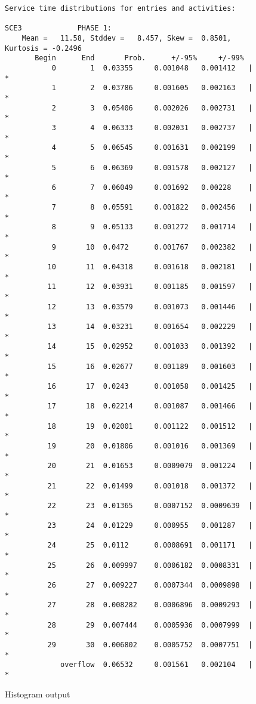 \begin{sidewaysfigure}
\begin{verbatim}
Service time distributions for entries and activities:

SCE3             PHASE 1: 
    Mean =   11.58, Stddev =   8.457, Skew =  0.8501, Kurtosis = -0.2496
       Begin      End       Prob.      +/-95%     +/-99%
           0        1  0.03355     0.001048   0.001412   |          *
           1        2  0.03786     0.001605   0.002163   |            *
           2        3  0.05406     0.002026   0.002731   |                 *
           3        4  0.06333     0.002031   0.002737   |                   *
           4        5  0.06545     0.001631   0.002199   |                    *
           5        6  0.06369     0.001578   0.002127   |                   *
           6        7  0.06049     0.001692   0.00228    |                  *
           7        8  0.05591     0.001822   0.002456   |                 *
           8        9  0.05133     0.001272   0.001714   |                *
           9       10  0.0472      0.001767   0.002382   |              *
          10       11  0.04318     0.001618   0.002181   |             *
          11       12  0.03931     0.001185   0.001597   |            *
          12       13  0.03579     0.001073   0.001446   |           *
          13       14  0.03231     0.001654   0.002229   |          *
          14       15  0.02952     0.001033   0.001392   |         *
          15       16  0.02677     0.001189   0.001603   |        *
          16       17  0.0243      0.001058   0.001425   |       *
          17       18  0.02214     0.001087   0.001466   |       *
          18       19  0.02001     0.001122   0.001512   |      *
          19       20  0.01806     0.001016   0.001369   |      *
          20       21  0.01653     0.0009079  0.001224   |     *
          21       22  0.01499     0.001018   0.001372   |     *
          22       23  0.01365     0.0007152  0.0009639  |    *
          23       24  0.01229     0.000955   0.001287   |    *
          24       25  0.0112      0.0008691  0.001171   |   *
          25       26  0.009997    0.0006182  0.0008331  |   *
          26       27  0.009227    0.0007344  0.0009898  |   *
          27       28  0.008282    0.0006896  0.0009293  |   *
          28       29  0.007444    0.0005936  0.0007999  |  *
          29       30  0.006802    0.0005752  0.0007751  |  *
             overflow  0.06532     0.001561   0.002104   | *
\end{verbatim}
  \caption{Histogram output}
  \label{fig:histogram}
\end{sidewaysfigure}

